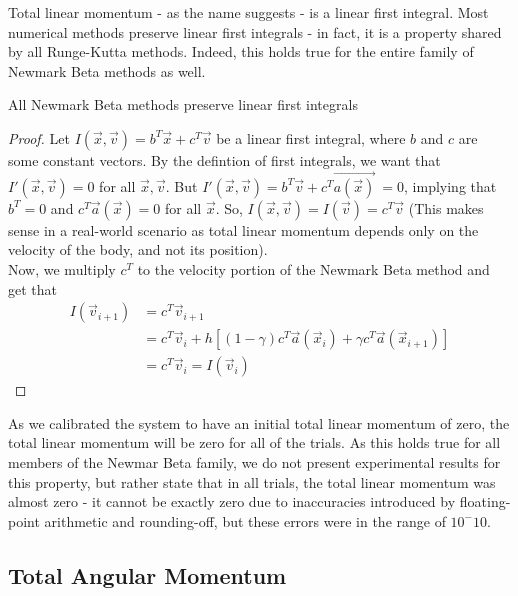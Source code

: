 \documentclass[../Main.tex]{subfiles}
\begin{document}
Total linear momentum - as the name suggests - is a linear first integral. Most numerical methods preserve linear first integrals - in fact, it is a property shared by all Runge-Kutta methods. Indeed, this holds true for the entire family of Newmark Beta methods as well.
\begin{claim} All Newmark Beta methods preserve linear first integrals \end{claim}
\begin{proof}
Let $I(\vec{x}, \vec{v}) = b^{T}\vec{x} + c^{T}\vec{v}$ be a linear first integral, where $b$ and $c$ are some constant vectors.
By the defintion of first integrals, we want that $I'(\vec{x}, \vec{v})= 0$ for all $\vec{x}, \vec{v}$.
But $I'(\vec{x}, \vec{v}) = b^{T}\vec{v} + c^{T}\vec{a(\vec{x})}\ = 0$, implying that $b^{T} = 0$ and $c^{T}\vec{a}(\vec{x}) = 0$ for all $\vec{x}$. So, $I(\vec{x}, \vec{v}) = I(\vec{v}) = c^{T}\vec{v}$ (This makes sense in a real-world scenario as total linear momentum depends only on the velocity of the body, and not its position).\\
Now, we multiply $c^{T}$ to the velocity portion of the Newmark Beta method and get that
\begin{align*}
I\left(\vec{v}_{i+1}\right) &= c^{T}\vec{v}_{i+1} \\
&= c^{T}\vec{v}_{i} + h\left[\left(1-\gamma\right)c^{T}\vec{a}(\vec{x}_{i}) + \gamma c^{T}\vec{a}(\vec{x}_{i+1})\right] \\
&= c^{T}\vec{v}_{i} = I\left(\vec{v}_{i}\right)
\end{align*} 
\end{proof}

As we calibrated the system to have an initial total linear momentum of zero, the total linear momentum will be zero for all of the trials. As this holds true for all members of the Newmar Beta family, we do not present experimental results for this property, but rather state that in all trials, the total linear momentum was almost zero - it cannot be exactly zero due to inaccuracies introduced by floating-point arithmetic and rounding-off, but these errors were in the range of $10^-{10}$.

\subsection{Total Angular Momentum}
\end{document}
